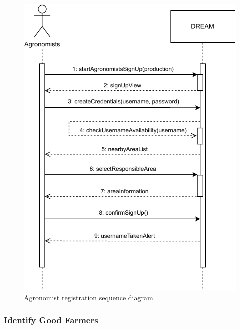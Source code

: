 \documentclass[../../main.tex]{subfiles}
\begin{document}
      \begin{figure}[H]
        \centering
        \includegraphics[width=\textwidth]{RASD/image/Sequence_Diagram_Agronomists.pdf}
        \caption{Agronomist registration sequence diagram}
      \end{figure}

      
      \subsubsection{Identify Good Farmers}
\end{document}
